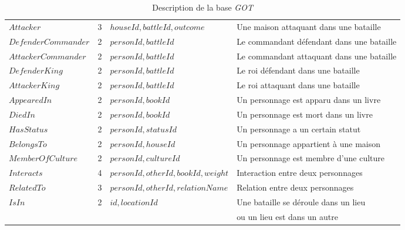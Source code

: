 \begin{table}[H]
\begin{adjustbox}{max width=\linewidth}
\begin{tabular}{l|c|l|l}
            $Attacker$          & 3     & $houseId, battleId, outcome$              & Une maison attaquant dans une bataille    \\
            $DefenderCommander$ & 2     & $personId, battleId$                      & Le commandant défendant dans une bataille \\
            $AttackerCommander$ & 2     & $personId, battleId$                      & Le commandant attaquant dans une bataille \\
            $DefenderKing$      & 2     & $personId, battleId$                      & Le roi défendant dans une bataille        \\
            $AttackerKing$      & 2     & $personId, battleId$                      & Le roi attaquant dans une bataille        \\
            $AppearedIn$        & 2     & $personId, bookId$                        & Un personnage est apparu dans un livre    \\
            $DiedIn$            & 2     & $personId, bookId$                        & Un personnage est mort dans un livre      \\
            $HasStatus$         & 2     & $personId, statusId$                      & Un personnage a un certain statut         \\
            $BelongsTo$         & 2     & $personId, houseId$                       & Un personnage appartient à une maison     \\
            $MemberOfCulture$   & 2     & $personId, cultureId$                     & Un personnage est membre d'une culture    \\
            $Interacts$         & 4     & $personId, otherId, bookId, weight$       & Interaction entre deux personnages        \\
            $RelatedTo$         & 3     & $personId, otherId, relationName$         & Relation entre deux personnages           \\
            $IsIn$              & 2     & $id, locationId$                          & Une bataille se déroule dans un lieu      \\
                                &       &                                           & ou un lieu est dans un autre              \\
        \end{tabular}
    \end{adjustbox}
    \caption{Description de la base \emph{GOT}}
\end{table}

